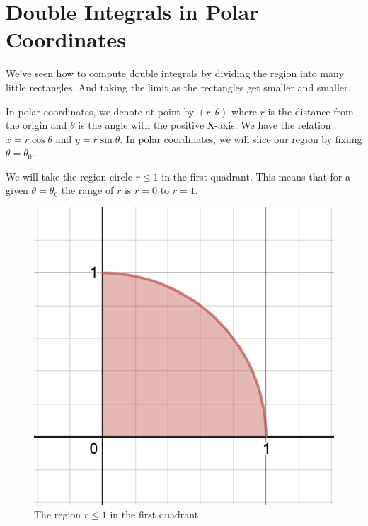 

\chapter{Double Integrals in Polar Coordinates}

\bigbreak

We've seen how to compute double integrals by dividing the region into many little rectangles.
And taking the limit as the rectangles get smaller and smaller.

In polar coordinates, we denote at point by $(r, \theta)$ where $r$ is the distance from the origin and $\theta$ is the angle with the positive X-axis.
We have the relation $x = r \cos \theta$ and $y = r \sin \theta$.
In polar coordinates, we will slice our region by fixiing $\theta = \theta_0$.

We will take the region circle $r \leq 1$ in the first quadrant.
This means that for a given $\theta = \theta_0$ the range of $r$ is $r = 0$ to $r = 1$.

\begin{figure}[ht!]
    \centering
    \includegraphics[scale=0.5]{./images/lecture_12_figure_1.png}
    \caption{The region $r \leq 1$ in the first quadrant}
\end{figure}


